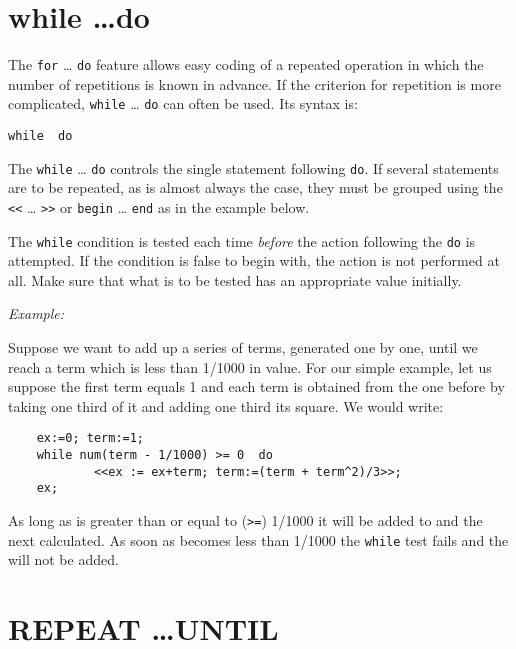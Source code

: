 \section{while \ldots do}
\hypertarget{command:WHILE}{}

The \texttt{for} \ldots{} \texttt{do} feature
allows easy coding of a repeated operation in which the number of repetitions
is known in advance.  If the criterion for repetition is more complicated,
\texttt{while} \ldots{} \texttt{do} can often be used.  Its syntax is:
\begin{syntax}
  \texttt{while }\texttt{ do }
\end{syntax}
The \texttt{while} \ldots{} \texttt{do} controls the single statement
following \texttt{do}.
If several statements are to be repeated, as is almost always the case,
they must be grouped using the \texttt{<}\texttt{<} \ldots{} \texttt{>}\texttt{>}
or \texttt{begin} \ldots{} \texttt{end}
as in the example below.

The \texttt{while} condition is tested each time \emph{before} the action
following the \texttt{do} is attempted.  If the condition is false to begin
with, the action is not performed at all.  Make sure that what is to be
tested has an appropriate value initially.

\textit{Example:}

Suppose we want to add up a series of terms, generated one by one, until
we reach a term which is less than 1/1000 in value.  For our simple
example, let us suppose the first term equals 1 and each term is obtained
from the one before by taking one third of it and adding one third its
square. We would write:
\begin{verbatim}
    ex:=0; term:=1;
    while num(term - 1/1000) >= 0  do
            <<ex := ex+term; term:=(term + term^2)/3>>;
    ex;
\end{verbatim}
As long as  is greater than or equal to (\texttt{>=}) 1/1000 it will
be added to  and the next  calculated.  As soon as
 becomes less than 1/1000 the \texttt{while} test fails and the
 will not be added.


\section{REPEAT \ldots UNTIL}
\hypertarget{command:REPEAT}{}
\hypertarget{reserved:UNTIL}{}

